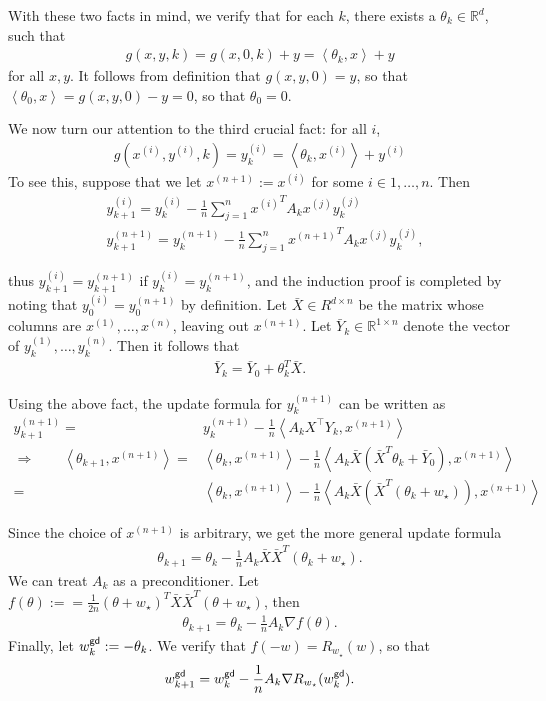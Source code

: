 \documentclass{article}
\newcommand{\R}{\mathbb{R}}
\newcommand{\wstar}{w_\star}
\newcommand{\tx}[1]{x^{(#1)}}
\newcommand{\ty}[1]{y^{(#1)}}
\newcommand{\wgd}{w^{\sf gd}}
\newcommand*\lin[1]{\left\langle #1 \right\rangle}
\newcommand*\lrp[1]{\left( #1 \right)}
\begin{document}
With these two facts in mind, we verify that for each $k$, there exists a $\theta_k\in \R^d$, such that
\begin{align*}
g(x,y,k) = g(x,0,k) + y = \lin{\theta_k, x} + y
\end{align*}
for all $x,y$. It follows from definition that $g(x,y,0) = y$, so that $\lin{\theta_0,x} = g(x,y,0) - y = 0$, so that $\theta_0 = 0$. 

We now turn our attention to the third crucial fact: for all $i$, 
\begin{align*}
g(\tx{i},\ty{i},k) = \ty{i}_k = \lin{\theta_k, \tx{i}} + \ty{i}
\end{align*}
To see this, suppose that we let $\tx{n+1} := \tx{i}$ for some $i\in 1,\dots,n$. Then
\begin{align*}
& \ty{i}_{k+1} = \ty{i}_{k} - \frac{1}{n} \sum_{j=1}^{n} {\tx{i}}^T A_k \tx{j} \ty{j}_k\\
& \ty{n+1}_{k+1} = \ty{n+1}_{k} - \frac{1}{n} \sum_{j=1}^{n} {\tx{n+1}}^T A_k \tx{j} \ty{j}_k,
\end{align*}

thus $\ty{i}_{k+1} = \ty{n+1}_{k+1}$ if $\ty{i}_{k} = \ty{n+1}_{k}$, and the induction proof is completed by noting that $\ty{i}_{0} = \ty{n+1}_{0}$ by definition. Let $\bar{X} \in R^{d\times n}$ be the matrix whose columns are $\tx{1} ,\dots, \tx{n}$, leaving out $\tx{n+1}$. Let $\bar{Y}_k \in \R^{1\times n}$ denote the vector of $\ty{1}_k,\dots,\ty{n}_k$. Then it follows that
\begin{align*}
\bar{Y}_k = \bar{Y}_0 + \theta_k^T \bar{X}.
\end{align*}

Using the above fact, the update formula for $\ty{n+1}_k$ can be written as 
\begin{align*}
\ty{n+1}_{k+1} =& \ty{n+1}_{k} - \frac{1}{n} \lin{A_k X^\top Y_k, \tx{n+1}}\\
\Rightarrow \qquad 
\lin{\theta_{k+1}, \tx{n+1}} 
=& \lin{\theta_k, \tx{n+1}} - \frac{1}{n} \lin{A_k \bar{X} \lrp{\bar{X}^T \theta_k + \bar{Y}_0}, \tx{n+1}}\\
=& \lin{\theta_k, \tx{n+1}} - \frac{1}{n} \lin{A_k \bar{X} \lrp{\bar{X}^T \lrp{\theta_k + \wstar}}, \tx{n+1}}
\end{align*}

Since the choice of $\tx{n+1}$ is arbitrary, we get the more general update formula 
\begin{align*}
\theta_{k+1} = \theta_k - \frac{1}{n} A_k \bar{X} \bar{X}^T 
\lrp{\theta_k + \wstar}.
\end{align*}
We can treat $A_k$ as a preconditioner. Let $f(\theta):== \frac{1}{2n} \lrp{\theta+\wstar}^T \bar{X} \bar{X}^T (\theta+\wstar)$, then
\begin{align*}
\theta_{k+1} = \theta_k - \frac{1}{n} A_k \nabla f(\theta).
\end{align*}
Finally, let $\wgd_k := - \theta_k$. We verify that $f(-w) = R_{\wstar}(w)$, so that 
\begin{align*}
\wgd_{k+1} = \wgd_k - \frac{1}{n} A_k \nabla R_{\wstar}(\wgd_k).
\end{align*}
\end{document}
